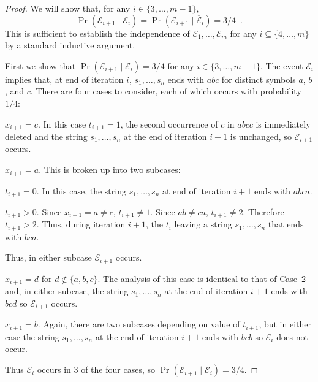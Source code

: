\documentclass{patmorin}
\begin{document}
\begin{proof}
  We will show that, for any $i\in\{3,\ldots,m-1\}$,
  \[
    \Pr(\mathcal{E}_{i+1}\mid \mathcal{E}_{i})
    = \Pr(\mathcal{E}_{i+1}\mid \overline{\mathcal{E}}_{i})
    = 3/4   \enspace .
  \]
  This is sufficient to establish the independence of $\mathcal{E}_1, \ldots, \mathcal{E}_m$
  for any $i\subseteq\{4,\ldots,m\}$ by a standard inductive argument.
  
  First we show that $\Pr(\mathcal{E}_{i+1}\mid \mathcal{E}_{i})=3/4$ for any $i\in\{3,\ldots,m-1\}$.  The event $\mathcal{E}_i$ implies that, at end of iteration $i$, $s_1,\ldots,s_n$ ends with $abc$ for distinct symbols $a$, $b$, and $c$.  There are four cases to consider, each of which occurs with probability $1/4$:
  \begin{compactenum}
    \item $x_{i+1}=c$.  In this case $t_{i+1}=1$, the second occurrence of $c$ in $abcc$ is immediately deleted and the string $s_1,\ldots,s_n$ at the end of iteration $i+1$ is unchanged, so $\mathcal{E}_{i+1}$ occurs.
    
    \item $x_{i+1}=a$.  This is broken up into two subcases:
    \begin{compactenum}
      \item $t_{i+1}=0$.  In this case, the string $s_1,\ldots,s_n$ at end of iteration $i+1$ ends with $abca$.
      \item $t_{i+1}>0$.  Since $x_{i+1}=a\neq c$, $t_{i+1}\neq 1$.  Since $ab\neq ca$, $t_{i+1}\neq 2$.  Therefore $t_{i+1}>2$.  Thus, during iteration $i+1$, the $t_{i}$ leaving a string $s_1,\ldots,s_n$ that ends with $bca$.
    \end{compactenum}
    Thus, in either subcase $\mathcal{E}_{i+1}$ occurs.
    
    \item $x_{i+1}=d$ for $d\not\in\{a,b,c\}$.  The analysis of this case is identical to that of Case~2 and, in either subcase, the string $s_1,\ldots,s_n$ at the end of iteration $i+1$ ends with $bcd$ so $\mathcal{E}_{i+1}$ occurs.
    
    \item $x_{i+1}=b$.  Again, there are two subcases depending on value of $t_{i+1}$, but in either case the string $s_1,\ldots,s_n$ at the end of iteration $i+1$ ends with $bcb$ so $\mathcal{E}_i$ does not occur.
  \end{compactenum}
  Thus $\mathcal{E}_i$ occurs in 3 of the four cases, so $\Pr(\mathcal{E}_{i+1}\mid \mathcal{E}_{i})=3/4$.
  

\end{proof}
\end{document}
